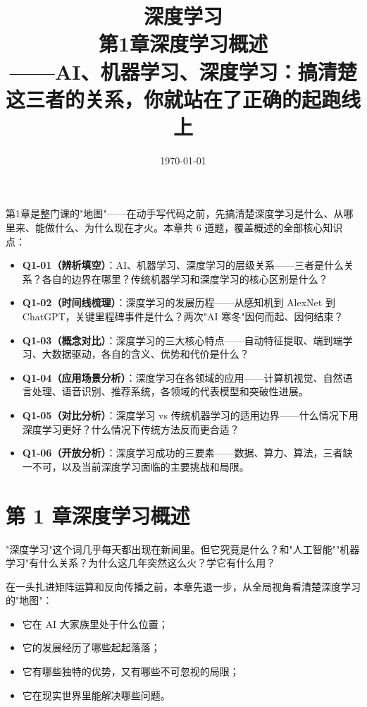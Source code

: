\documentclass[a4paper,11pt]{ctexart}
\title{\textbf{深度学习\\第1章\quad 深度学习概述}\\[0.5em]
{\large\color{gray}——AI、机器学习、深度学习：搞清楚这三者的关系，你就站在了正确的起跑线上}}
\date{\today}
\begin{document}
\maketitle

\begin{beginnerbox}
    第1章是整门课的"地图"——在动手写代码之前，先搞清楚深度学习是什么、从哪里来、能做什么、为什么现在才火。本章共 6 道题，覆盖概述的全部核心知识点：

    \begin{itemize}
        \item \textbf{Q1-01（辨析填空）}：AI、机器学习、深度学习的层级关系——三者是什么关系？各自的边界在哪里？传统机器学习和深度学习的核心区别是什么？
        \item \textbf{Q1-02（时间线梳理）}：深度学习的发展历程——从感知机到 AlexNet 到 ChatGPT，关键里程碑事件是什么？两次"AI 寒冬"因何而起、因何结束？
        \item \textbf{Q1-03（概念对比）}：深度学习的三大核心特点——自动特征提取、端到端学习、大数据驱动，各自的含义、优势和代价是什么？
        \item \textbf{Q1-04（应用场景分析）}：深度学习在各领域的应用——计算机视觉、自然语言处理、语音识别、推荐系统，各领域的代表模型和突破性进展。
        \item \textbf{Q1-05（对比分析）}：深度学习 vs 传统机器学习的适用边界——什么情况下用深度学习更好？什么情况下传统方法反而更合适？
        \item \textbf{Q1-06（开放分析）}：深度学习成功的三要素——数据、算力、算法，三者缺一不可，以及当前深度学习面临的主要挑战和局限。
    \end{itemize}
\end{beginnerbox}

\section{第 1 章\quad 深度学习概述}

"深度学习"这个词几乎每天都出现在新闻里。但它究竟是什么？和"人工智能""机器学习"有什么关系？为什么这几年突然这么火？学它有什么用？

在一头扎进矩阵运算和反向传播之前，本章先退一步，从全局视角看清楚深度学习的"地图"：

\begin{itemize}
    \item 它在 AI 大家族里处于什么位置；
    \item 它的发展经历了哪些起起落落；
    \item 它有哪些独特的优势，又有哪些不可忽视的局限；
    \item 它在现实世界里能解决哪些问题。
\end{itemize}
\end{document}
